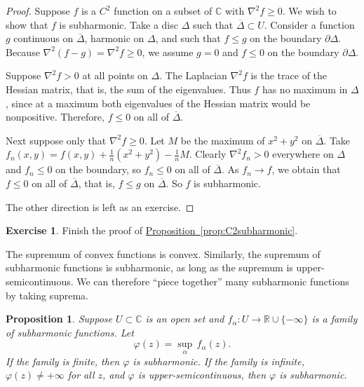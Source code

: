 \documentclass[12pt,openany]{book}
\newcommand{\C}{{\mathbb{C}}}
\newcommand{\R}{{\mathbb{R}}}
\newcommand{\myquote}[1]{``#1''}
\theoremstyle{plain}
\newtheorem{prop}[thm]{Proposition}
\theoremstyle{remark}
\theoremstyle{definition}
\newenvironment{exbox}{%
    \def\FrameCommand{\vrule width 1pt \relax\hspace{10pt}}%
    \MakeFramed{\advance\hsize-\width\FrameRestore}%
}{%
    \endMakeFramed
}
\theoremstyle{exercise}
\newtheorem{exercise}{Exercise}[section]
\theoremstyle{example}
\newcommand{\propref}[1]{\hyperref[#1]{Proposition~\ref*{#1}}}
\begin{document}
\begin{proof}
Suppose $f$ is a $C^2$ function on a subset of $\C$
with $\nabla^2 f \geq 0$.  We wish to show that $f$ is subharmonic.
Take a disc $\Delta$ such that $\overline{\Delta} \subset U$.
Consider a function
$g$ continuous on $\overline{\Delta}$,
harmonic on $\Delta$, and such that
$f \leq g$ on the boundary $\partial \Delta$.  Because
$\nabla^2 (f-g) = \nabla^2 f \geq 0$, we assume $g = 0$ and $f \leq 0$
on the boundary $\partial \Delta$. 

Suppose $\nabla^2 f > 0$ at all points on $\Delta$.
The Laplacian $\nabla^2 f$ is the trace of the Hessian matrix,
that is, the sum of the eigenvalues.  Thus $f$ has no maximum 
in $\Delta$, since at a maximum both eigenvalues of the Hessian matrix
would be nonpositive.
Therefore, $f \leq 0$ on all of $\overline{\Delta}$.

Next suppose only that $\nabla^2 f \geq 0$.
Let $M$ be the maximum of $x^2+y^2$ on $\overline{\Delta}$.
Take $f_n(x,y) = f(x,y) + \frac{1}{n}
( x^2+y^2 ) - \frac{1}{n}M$.  Clearly $\nabla^2 f_n > 0$ everywhere on
$\Delta$ and
$f_n \leq 0$ on the boundary, so $f_n \leq 0$ 
on all of $\overline{\Delta}$.  As $f_n \to f$, we obtain that
$f \leq 0$ on all of $\overline{\Delta}$, that is, $f \leq g$ on
$\overline{\Delta}$.
So $f$ is subharmonic.

The other direction is left as an exercise.
\end{proof}

\begin{exbox}
\begin{exercise}
Finish the proof of \propref{prop:C2subharmonic}.
\end{exercise}
\end{exbox}

The supremum of convex functions is convex.
Similarly,
the supremum of subharmonic functions is subharmonic, as long as
the supremum is upper-semicontinuous.  We can therefore
\myquote{piece together}
many subharmonic functions by taking suprema.

\begin{prop}
Suppose $U \subset \C$ is an open set and $f_\alpha \colon U \to \R \cup \{ -\infty \}$
is a family of subharmonic functions.  Let
\begin{equation*}
\varphi(z) = \sup_\alpha\, f_\alpha(z) .
\end{equation*}
If the family is finite, then $\varphi$ is subharmonic.
If the family is infinite, $\varphi(z) \neq +\infty$ for
all $z$, and $\varphi$
is upper-semicontinuous, then $\varphi$ is subharmonic.
\end{prop}
\end{document}
